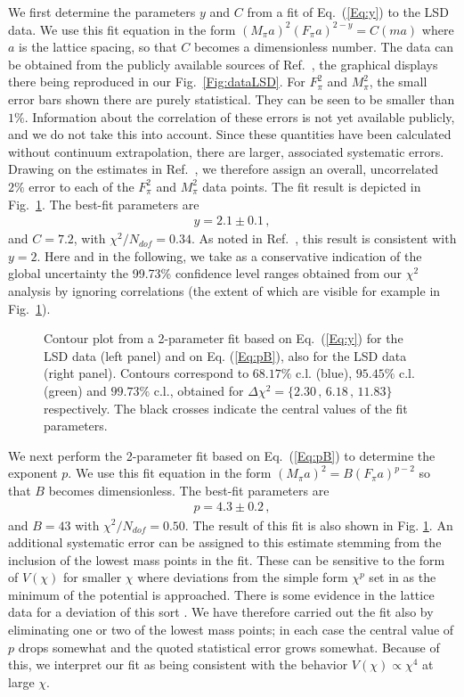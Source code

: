 \documentclass[a4paper,11pt]{article}
\newcommand{\beqs}{\begin{eqnarray}}
\newcommand{\eeqs}{\end{eqnarray}}
\begin{document}
We first determine the parameters $y$ and $C$ from a fit of Eq.~(\ref{Eq:y}) to the LSD data. We use this fit equation in the form $(M_{\pi}a)^2 (F_{\pi}a)^{2-y} = C (ma)$ where $a$ is the lattice spacing, so that $C$ becomes a dimensionless number. The data can be obtained from the publicly available sources of Ref.~\cite{LSD}, the graphical displays there being reproduced in our Fig.~\ref{Fig:dataLSD}. For $F_{\pi}^2$ and $M_{\pi}^2$, the small error bars shown there are purely statistical. They can be seen to be smaller than $1\%$. Information about the correlation of these errors is not yet available publicly, and we do not take this into account. Since these quantities have been calculated without continuum extrapolation, there are larger, associated systematic errors. Drawing on the estimates in Ref.~\cite{LSD}, we therefore assign an overall, uncorrelated $2\%$ error to each of the $F_{\pi}^2$ and $M_{\pi}^2$ data points. The fit result is depicted in Fig.~\ref{Fig:yALSD}. The best-fit parameters are 
\beqs
y = 2.1\pm0.1\,,
\label{Eq:LSDy}
\eeqs
and $C = 7.2$, with $\chi^2/N_{dof}=0.34$. As noted in Ref.~\cite{AIP}, this result is consistent with $y=2$. Here and in the following, we take as a conservative indication of the global uncertainty the 99.73\% confidence level ranges obtained from our $\chi^2$ analysis by ignoring correlations (the extent of which are visible for example in Fig.~\ref{Fig:yALSD}). 
 
\begin{figure}[h]
\begin{center}
	\qquad
\caption{Contour plot from a 2-parameter fit based on Eq.~(\ref{Eq:y}) for the LSD data (left panel) and on Eq. (\ref{Eq:pB}), also for the LSD data (right panel). Contours correspond to $68.17\%$ c.l. (blue), $95.45\%$ c.l. (green) and $99.73\%$ c.l.,
obtained for $\Delta \chi^2=\{2.30\,,\,6.18\,,\,11.83\}$ respectively. The black crosses indicate the central values of the fit parameters.}
\label{Fig:yALSD}
\end{center}
\end{figure}


We next perform the 2-parameter fit based on Eq.~(\ref{Eq:pB}) to
determine the exponent $p$. We use this fit equation in the form $(M_{\pi}a)^2 = B(F_{\pi}a)^{p-2}$ so that $B$ becomes dimensionless. The best-fit parameters are 
\beqs
p = 4.3\pm0.2\, ,
\eeqs
and $B=43$ with $\chi^2/N_{dof} = 0.50$. The result of this fit is also shown in Fig. \ref{Fig:yALSD}. An additional systematic error can be assigned to this estimate stemming from the inclusion of the lowest mass points in the fit. These can be sensitive to the form of $V(\chi)$ for smaller $\chi$ where deviations from the simple form $\chi^p$ set in as the minimum of the potential is approached. There is some evidence in the lattice data for a deviation of this sort \cite{LSD}.  We have therefore carried out the fit also by eliminating one or two of the lowest mass points; in each case the central value of $p$ drops somewhat and the quoted statistical error grows somewhat. Because of this, we interpret our fit as being consistent with the behavior $V(\chi) \propto \chi^4$ at large $\chi$.
\end{document}
